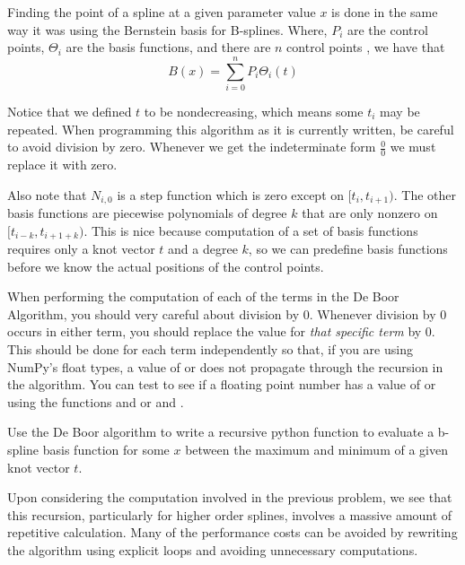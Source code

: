 Finding the point of a spline at a given parameter value $x$ is done in the same way it was using the Bernstein basis for B-splines.
Where, $P_i$ are the control points, $\Theta_i$ are the basis functions, and there are $n$ control points , we have that
\[B\left(x\right) = \sum_{i=0}^n P_i \Theta_i\left(t\right)\]

Notice that we defined $t$ to be nondecreasing, which means some $t_i$ may be repeated.
When programming this algorithm as it is currently written, be careful to avoid division by zero.
Whenever we get the indeterminate form $\frac{0}{0}$ we must replace it with zero.

Also note that $N_{i,0}$ is a step function which is zero except on $[t_i, t_{i+1})$.
The other basis functions are piecewise polynomials of degree $k$ that are only nonzero on $[t_{i-k}, t_{i+1+k})$.
This is nice because computation of a set of basis functions requires only a knot vector $t$ and a degree $k$, so we can predefine basis functions before we know the actual positions of the control points.

\begin{warn}
When performing the computation of each of the terms in the De Boor Algorithm, you should very careful about division by $0$.
Whenever division by $0$ occurs in either term, you should replace the value for \emph{that specific term} by $0$.
This should be done for each term independently so that, if you are using NumPy's float types, a value of  or  does not propagate through the recursion in the algorithm.
You can test to see if a floating point number has a value of  or  using the functions  and  or  and .
\end{warn}

\begin{problem}
Use the De Boor algorithm to write a recursive python function to evaluate a b-spline basis function for some $x$ between the maximum and minimum of a given knot vector $t$.
\end{problem}

Upon considering the computation involved in the previous problem, we see that this recursion, particularly for higher order splines, involves a massive amount of repetitive calculation.
Many of the performance costs can be avoided by rewriting the algorithm using explicit loops and avoiding unnecessary computations.

